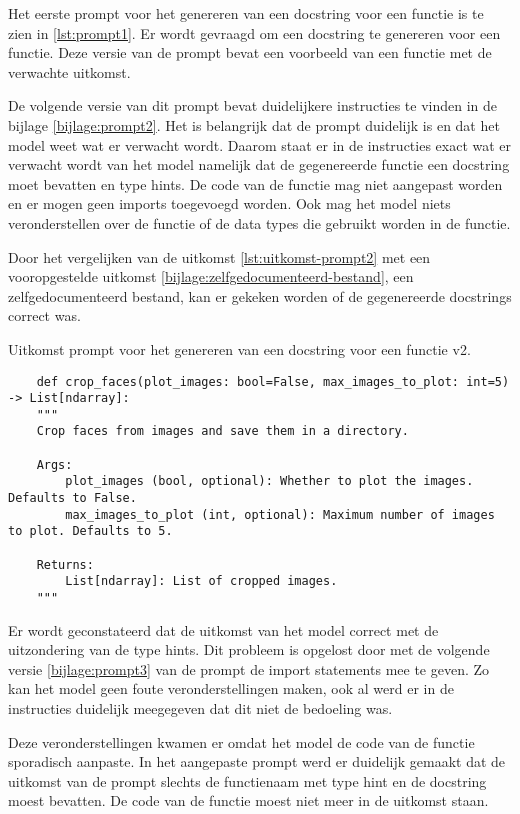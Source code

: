 Het eerste prompt voor het genereren van een docstring voor een functie is te zien in \ref{lst:prompt1}.
Er wordt gevraagd om een docstring te genereren voor een functie. Deze versie van de prompt bevat een voorbeeld van een functie met de verwachte uitkomst. 

De volgende versie van dit prompt bevat duidelijkere instructies te vinden in de bijlage \ref{bijlage:prompt2}.
Het is belangrijk dat de prompt duidelijk is en dat het model weet wat er verwacht wordt. 
Daarom staat er in de instructies exact wat er verwacht wordt van het model namelijk dat de gegenereerde functie een docstring moet bevatten en type hints.
De code van de functie mag niet aangepast worden en er mogen geen imports toegevoegd worden.
Ook mag het model niets veronderstellen over de functie of de data types die gebruikt worden in de functie.

Door het vergelijken van de uitkomst \ref{lst:uitkomst-prompt2} met een vooropgestelde uitkomst \ref{bijlage:zelfgedocumenteerd-bestand}, een zelfgedocumenteerd bestand, kan er gekeken worden of de gegenereerde docstrings correct was.
\begin{listing}
    \caption{Uitkomst prompt voor het genereren van een docstring voor een functie v2.}
    \label{lst:uitkomst-prompt2}
    \begin{verbatim}
    def crop_faces(plot_images: bool=False, max_images_to_plot: int=5) -> List[ndarray]:
    """
    Crop faces from images and save them in a directory.

    Args:
        plot_images (bool, optional): Whether to plot the images. Defaults to False.
        max_images_to_plot (int, optional): Maximum number of images to plot. Defaults to 5.

    Returns:
        List[ndarray]: List of cropped images.
    """
    \end{verbatim}
\end{listing}
Er wordt geconstateerd dat de uitkomst van het model correct met de uitzondering van de type hints. 
Dit probleem is opgelost door met de volgende versie \ref{bijlage:prompt3} van de prompt de import statements mee te geven.
Zo kan het model geen foute veronderstellingen maken, ook al werd er in de instructies duidelijk meegegeven dat dit niet de bedoeling was.

Deze veronderstellingen kwamen er omdat het model de code van de functie sporadisch aanpaste.
In het aangepaste prompt werd er duidelijk gemaakt dat de uitkomst van de prompt slechts de functienaam met type hint en de docstring moest bevatten.
De code van de functie moest niet meer in de uitkomst staan.

